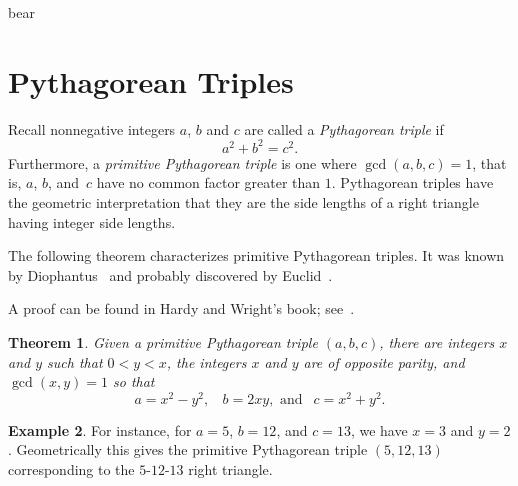 \documentclass[12pt,table]{article}
\newtheorem{theorem}{Theorem}[section]
\theoremstyle{definition}
\newtheorem{example}[theorem]{Example}
\theoremstyle{remark}
\newcommand{\vanish}[1]{}
\newcommand{\fix}[1]{\todo[inline]{#1}}
\numberwithin{equation}{section}
\begin{document}
\listoftodos

\fix{koala}

bear



\section{Pythagorean Triples}




Recall nonnegative integers $a$, $b$ and $c$ are called a
{\em Pythagorean triple} if
$$
    a^2 + b^2 = c^2.
$$
Furthermore, a {\em primitive Pythagorean triple}
is one where $\gcd(a,b,c) = 1$, that is,
$a$, $b$, and~$c$ have  no common factor greater than $1$.
Pythagorean triples have the geometric interpretation that
they are the side lengths of a right triangle having integer
side lengths.




The following theorem characterizes primitive Pythagorean triples.
It was known by Diophantus~\cite[Page 93]{Heath} and
probably discovered by Euclid~\cite{Euclid_Explanation}.




A proof can be found in Hardy and Wright's book; 
see~\cite[XIII, 13.2]{Hardy_and_Wright}.



\vanish{
Also see page 295 of Heath for
Fermat's area of triangle result.}



\begin{theorem}
Given a primitive
Pythagorean triple $(a,b,c)$, there are integers
$x$ and $y$ such that $0 < y < x$, 
the integers
$x$ and $y$ are of opposite parity,
and
$\gcd(x,y) = 1$
so that
\begin{equation}
\label{equation_primitive_Pythagorean_triple}
     a = x^2-y^2, \:\:\:\: 
     b = 2xy, \mbox{  and  } \:\: c=x^2+y^2.
\end{equation}
\end{theorem}


\begin{example}
{\rm
For instance, 
for
$a = 5$, $b = 12$, and $c = 13$,
we have
$x = 3$
and $y = 2$.
Geometrically this gives the primitive Pythagorean triple
$(5, 12, 13)$ corresponding to the 
$5$-$12$-$13$ right triangle. 
}
\end{example}
\end{document}
